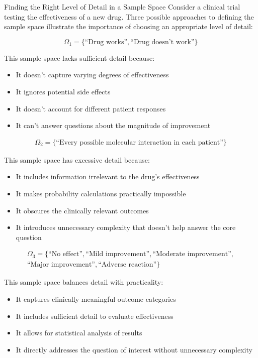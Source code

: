 \begin{exampleboxbreak}{Finding the Right Level of Detail in a Sample Space}
Consider a clinical trial testing the effectiveness of a new drug. Three possible approaches to defining the sample space illustrate the importance of choosing an appropriate level of detail:

\[ \Omega_1 = \{\text{``Drug works''}, \text{``Drug doesn't work''}\} \]

This sample space lacks sufficient detail because:
\begin{itemize}
    \item It doesn't capture varying degrees of effectiveness
    \item It ignores potential side effects
    \item It doesn't account for different patient responses
    \item It can't answer questions about the magnitude of improvement
\end{itemize}

\begin{align*}
\Omega_2 = \{\text{``Every possible molecular interaction in each patient''}\}
\end{align*}

This sample space has excessive detail because:
\begin{itemize}
    \item It includes information irrelevant to the drug's effectiveness
    \item It makes probability calculations practically impossible
    \item It obscures the clinically relevant outcomes
    \item It introduces unnecessary complexity that doesn't help answer the core question
\end{itemize}

\begin{align*}
\Omega_3 = \{\text{``No effect''}, \text{``Mild improvement''}, \text{``Moderate improvement''}, \\ 
\text{``Major improvement''}, \text{``Adverse reaction''}\}
\end{align*}

This sample space balances detail with practicality:
\begin{itemize}
    \item It captures clinically meaningful outcome categories
    \item It includes sufficient detail to evaluate effectiveness
    \item It allows for statistical analysis of results
    \item It directly addresses the question of interest without unnecessary complexity
\end{itemize}
\end{exampleboxbreak}

